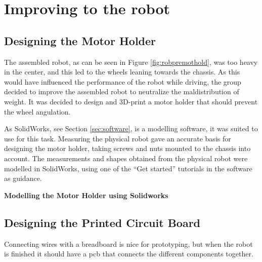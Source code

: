 \section{Improving to the robot}
\label{sec:improvements}

\subsection{Designing the Motor Holder}
The assembled robot, as can be seen in Figure \ref{fig:robpremothold}, was too heavy in the center, and this led to the wheels leaning towards the chassis. As this would have influenced the performance of the robot while driving, the group decided to improve the assembled robot to neutralize the maldistribution of weight. It was decided to design and 3D-print a motor holder that should prevent the wheel angulation.

As SolidWorks, see Section \ref{sec:software}, is a modelling software, it was suited to use for this task. Measuring the physical robot gave an accurate basis for designing the motor holder, taking screws and nuts mounted to the chassis into account. The measurements and shapes obtained from the physical robot were modelled in SolidWorks, using one of the ``Get started'' tutorials in the software as guidance.

\textbf{Modelling the Motor Holder using Solidworks}



\subsection{Designing the Printed Circuit Board}
Connecting wires with a breadboard is nice for prototyping, but when the robot is finished it should have a \acrshort{pcb} that connects the different components together. 